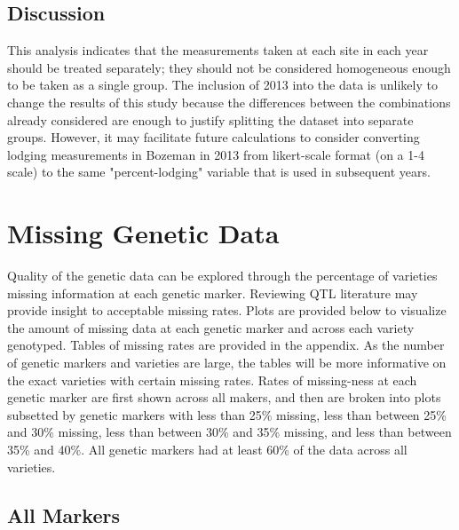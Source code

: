 \documentclass[11pt]{article}\usepackage[]{graphicx}\usepackage[]{color}
\begin{document}
\subsection{Discussion}
This analysis indicates that the measurements taken at each site in each year should be treated separately; they should not be considered homogeneous enough to be taken as a single group.  The inclusion of 2013 into the data is unlikely to change the results of this study because the differences between the combinations already considered are enough to justify splitting the dataset into separate groups.  However, it may facilitate future calculations to consider converting lodging measurements in Bozeman in 2013 from likert-scale format (on a 1-4 scale) to the same "percent-lodging" variable that is used in subsequent years. 


\pagebreak
\section{Missing Genetic Data}
Quality of the genetic data can be explored through the percentage of varieties missing information at each genetic marker. Reviewing QTL literature may provide insight to acceptable missing rates. Plots are provided below to visualize the amount of missing data at each genetic marker and across each variety genotyped. Tables of missing rates are provided in the appendix. As the number of genetic markers and varieties are large, the tables will be more informative on the exact varieties with certain missing rates. Rates of missing-ness at each genetic marker are first shown across all makers, and then are broken into plots subsetted by genetic markers with less than 25\% missing, less than between 25\% and 30\% missing, less than between 30\% and 35\% missing, and less than between 35\% and 40\%. All genetic markers had at least 60\% of the data across all varieties.

\subsection{All Markers}
\end{document}
